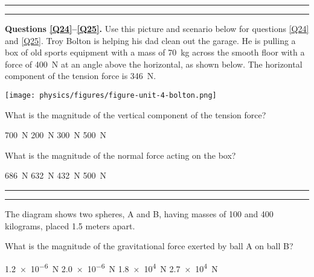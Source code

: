 \documentclass[answers]{exam}
\begin{document}
\begin{questions}
\bigskip
\hrule\hrule


\begin{EnvUplevel}
    \textbf{Questions \ref{Q24}--\ref{Q25}.} Use this picture and scenario below for questions \ref{Q24} and \ref{Q25}. Troy Bolton is helping his dad clean out the garage. He is pulling a box of old sports equipment with a mass of \SI{70}{kg} across the smooth floor with a force of \SI{400}{N} at an angle above the horizontal, as shown below. The horizontal component of the tension force is \SI{346}{N}.
\end{EnvUplevel}

\begin{center}
    \texttt{[image: physics/figures/figure-unit-4-bolton.png]}
\end{center}

\question \label{Q24}
What is the magnitude of the vertical component of the tension force?

\begin{randomizeoneparchoices}[norandomize]
    \choice \SI{700}{N}
    \correctchoice \SI{200}{N}
    \choice \SI{300}{N}
    \choice \SI{500}{N}
\end{randomizeoneparchoices}

\question \label{Q25}
What is the magnitude of the normal force acting on the box?

\begin{randomizeoneparchoices}[norandomize]
    \choice \SI{686}{N}
    \choice \SI{632}{N}
    \choice \SI{432}{N}
    \correctchoice \SI{500}{N}
\end{randomizeoneparchoices}
\bigskip
\hrule\hrule

\question
The diagram shows two spheres, A and B, having masses of 100 and 400 kilograms, placed 1.5 meters apart.

\begin{center}
\end{center}

What is the magnitude of the gravitational force exerted by ball A on ball B?

\begin{randomizeoneparchoices}
    \correctchoice \SI{1.2e-6}{N}
    \choice \SI{2.0e-6}{N}
    \choice \SI{1.8e4}{N}
    \choice \SI{2.7e4}{N}
\end{randomizeoneparchoices}


\end{questions}
\end{document}
